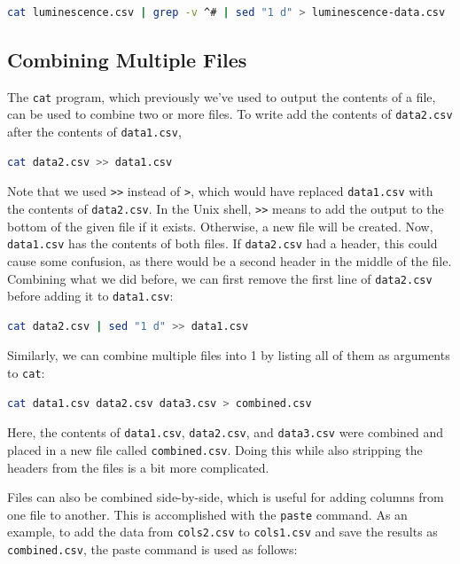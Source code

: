 \begin{lstlisting}[language=bash]
cat luminescence.csv | grep -v ^# | sed "1 d" > luminescence-data.csv
\end{lstlisting}
\subsection{Combining Multiple Files}

The \lstinline!cat! program, which previously we've used to output the
contents of a file, can be used to combine two or more files. To write
add the contents of \lstinline!data2.csv! after the contents of
\lstinline!data1.csv!,

\begin{lstlisting}[language=bash]
cat data2.csv >> data1.csv
\end{lstlisting}
Note that we used \lstinline!>>! instead of \lstinline!>!, which would
have replaced \lstinline!data1.csv! with the contents of
\lstinline!data2.csv!. In the Unix shell, \lstinline!>>! means to add
the output to the bottom of the given file if it exists. Otherwise, a
new file will be created. Now, \lstinline!data1.csv! has the contents of
both files. If \lstinline!data2.csv! had a header, this could cause some
confusion, as there would be a second header in the middle of the file.
Combining what we did before, we can first remove the first line of
\lstinline!data2.csv! before adding it to \lstinline!data1.csv!:

\begin{lstlisting}[language=bash]
cat data2.csv | sed "1 d" >> data1.csv
\end{lstlisting}
Similarly, we can combine multiple files into 1 by listing all of them
as arguments to \lstinline!cat!:

\begin{lstlisting}[language=bash]
cat data1.csv data2.csv data3.csv > combined.csv
\end{lstlisting}
Here, the contents of \lstinline!data1.csv!, \lstinline!data2.csv!, and
\lstinline!data3.csv! were combined and placed in a new file called
\lstinline!combined.csv!. Doing this while also stripping the headers
from the files is a bit more complicated.

Files can also be combined side-by-side, which is useful for adding
columns from one file to another. This is accomplished with the
\lstinline!paste! command. As an example, to add the data from
\lstinline!cols2.csv! to \lstinline!cols1.csv! and save the results as
\lstinline!combined.csv!, the paste command is used as follows:

